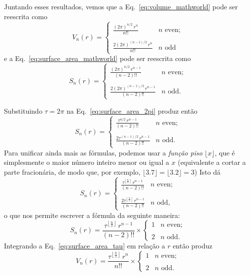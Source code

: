 {Juntando esses resultados, vemos que a Eq.~\eqref{eq:volume_mathworld} pode ser reescrita como
\begin{equation}
\label{eq:volume_2pi}
V_n(r) = \begin{cases}
 \displaystyle \frac{(2\pi)^{n/2}\,r^n}{n!!} & n \text{ even}; \\ \\
 \displaystyle \frac{2(2\pi)^{(n-1)/2}\,r^n}{n!!} & n \text{ odd}
 \end{cases}
\end{equation}
e a Eq.~\eqref{eq:surface_area_mathworld} pode ser reescrita como
\begin{equation}
\label{eq:surface_area_2pi}
S_n(r) = \begin{cases}
\displaystyle \frac{(2\pi)^{n/2}\,r^{n-1}}{(n-2)!!} & n \text{ even}; \\ \\
\displaystyle \frac{2(2\pi)^{(n-1)/2}\,r^{n-1}}{(n-2)!!} & n \text{ odd}.
\end{cases}
\end{equation}

Substituindo $\tau=2\pi$ na Eq.~\eqref{eq:surface_area_2pi} produz então
\[
S_n(r) = \begin{cases}
\displaystyle \frac{\tau^{n/2}\,r^{n-1}}{(n-2)!!} & n \text{ even}; \\ \\
\displaystyle \frac{2\tau^{(n-1)/2}\,r^{n-1}}{(n-2)!!} & n \text{ odd}.
\end{cases} \]
Para unificar ainda mais as fórmulas, podemos usar a \emph{função piso} $\lfloor x \rfloor$, que é simplesmente o maior número inteiro menor ou igual a $x$ (equivalente a cortar a parte fracionária, de modo que, por exemplo, $\lfloor 3.7 \rfloor = \lfloor 3.2 \rfloor = 3$) Isto dá
\[ S_n(r) = \begin{cases}
 \displaystyle \frac{\tau^{\left\lfloor \frac{n}{2} \right\rfloor}\,r^{n-1}}{(n-2)!!} & n \text{ even}; \\ \\
 \displaystyle \frac{2\tau^{\left\lfloor \frac{n}{2} \right\rfloor}\,r^{n-1}}{(n-2)!!} & n \text{ odd},
 \end{cases} \]
o que nos permite escrever a fórmula da seguinte maneira:
\begin{equation}
\label{eq:surface_area_tau}
S_n(r) = \frac{\tau^{\left\lfloor \frac{n}{2} \right\rfloor}\,r^{n-1}}{(n-2)!!}\times \begin{cases}
1 & n \text{ even}; \\ \\
2 & n \text{ odd}.
\end{cases}
\end{equation}
Integrando a Eq.~\eqref{eq:surface_area_tau} em relação a $r$ então produz
\begin{equation}
\label{eq:volume_tau}
V_n(r) = \frac{\tau^{\left\lfloor \frac{n}{2} \right\rfloor}\,r^n}{n!!}\times \begin{cases}
1 & n \text{ even}; \\ \\
2 & n \text{ odd}.
\end{cases}
\end{equation}

}
